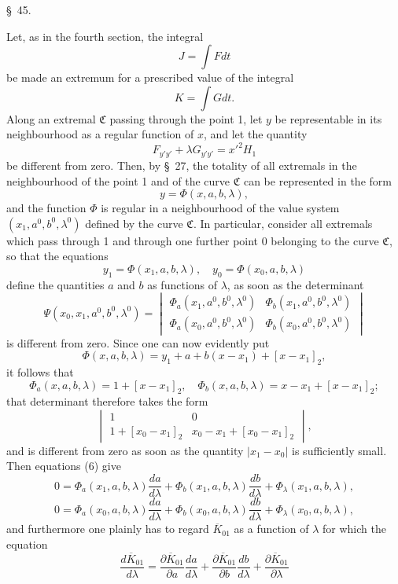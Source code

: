 \documentclass[11pt,a4paper,leqno]{article}
\begin{document}
\begin{center}
{\large \S~45.}
\end{center}

Let, as in the fourth section, the integral
\[
J=\int Fdt
\]
be made an extremum for a prescribed value of the integral
\[
K=\int Gdt.
\]
Along an extremal $\mathfrak{C}$ passing through the point 1, let $y$ be representable in its neighbourhood as a regular function of $x$, and let the quantity
\[
F_{y'y'}+\lambda G_{y'y'}=x'^2H_1
\]
be different from zero. Then, by \S~27, the totality of all extremals in the neighbourhood of the point 1 and of the curve $\mathfrak{C}$ can be represented in the form
\[
y=\Phi(x,a,b,\lambda),
\]
and the function $\Phi$ is regular in a neighbourhood of the value system $(x_1,a^0,b^0,\lambda^0)$ defined by the curve $\mathfrak{C}$. In particular, consider all extremals which pass through 1 and through one further point 0 belonging to the curve $\mathfrak{C}$, so that the equations
\begin{equation}\tag{6}
y_1=\Phi(x_1,a,b,\lambda),\quad y_0=\Phi(x_0,a,b,\lambda)
\end{equation}
define the quantities $a$ and $b$ as functions of $\lambda$, as soon as the determinant
\[
\Psi(x_0,x_1,a^0,b^0,\lambda^0)=
\begin{vmatrix}
\Phi_a(x_1,a^0,b^0,\lambda^0)&\Phi_b(x_1,a^0,b^0,\lambda^0)\\
\Phi_a(x_0,a^0,b^0,\lambda^0)&\Phi_b(x_0,a^0,b^0,\lambda^0)
\end{vmatrix}
\]
is different from zero. Since one can now evidently put
\[
\Phi(x,a,b,\lambda)=y_1+a+b(x-x_1)+[x-x_1]_2,
\]
it follows that
\[
\Phi_a(x,a,b,\lambda)=1+[x-x_1]_2,
\quad
\Phi_b(x,a,b,\lambda)=x-x_1+[x-x_1]_2;
\]
that determinant therefore takes the form
\[
\begin{vmatrix}
1&0\\
1+[x_0-x_1]_2&x_0-x_1+[x_0-x_1]_2
\end{vmatrix},
\]
and is different from zero as soon as the quantity $|x_1-x_0|$ is sufficiently small. Then equations (6) give
\[
0=\Phi_a(x_1,a,b,\lambda)\frac{da}{d\lambda}
+\Phi_b(x_1,a,b,\lambda)\frac{db}{d\lambda}
+\Phi_\lambda(x_1,a,b,\lambda),
\]
\[
0=\Phi_a(x_0,a,b,\lambda)\frac{da}{d\lambda}
+\Phi_b(x_0,a,b,\lambda)\frac{db}{d\lambda}
+\Phi_\lambda(x_0,a,b,\lambda),
\]
and furthermore one plainly has to regard $\overline{K}_{01}$ as a function of $\lambda$ for which the equation
\[
\frac{d\overline{K}_{01}}{d\lambda}
=\frac{\partial\overline{K}_{01}}{\partial a}\frac{da}{d\lambda}
+\frac{\partial\overline{K}_{01}}{\partial b}\frac{db}{d\lambda}
+\frac{\partial\overline{K}_{01}}{\partial\lambda}
\]
\end{document}
